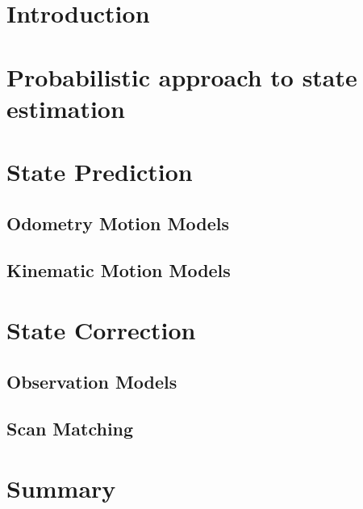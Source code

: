 \section{Introduction}

\section{Probabilistic approach to state estimation}

\section{State Prediction}
\subsection{Odometry Motion Models}
\subsection{Kinematic Motion Models}

\section{State Correction}
\subsection{Observation Models}
\subsection{Scan Matching}

\section{Summary}